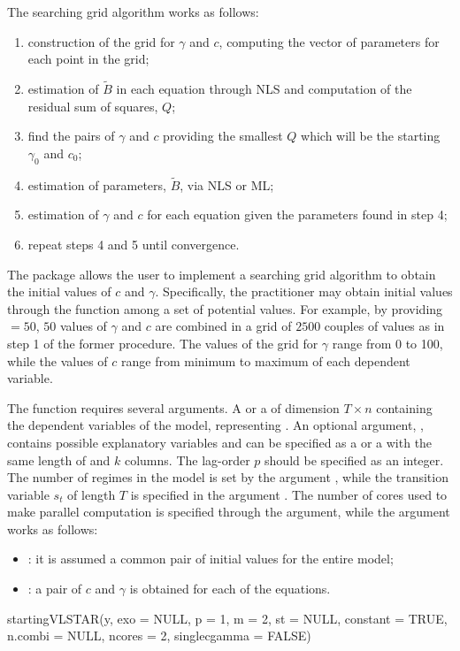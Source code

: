 The searching grid algorithm works as follows:
\begin{enumerate}
	\item construction of the grid for $\gamma$ and $c$, computing the vector of parameters for each point in the grid;
	\item estimation of $\tilde{B}$ in each equation through NLS and computation of the residual sum of squares, $Q$;
	\item find the pairs of $\gamma$ and $c$ providing the smallest $Q$ which will be the starting $\gamma_0$ and $c_0$;
	\item estimation of parameters, $\tilde{B}$, via NLS or ML;
	\item estimation of $\gamma$ and $c$ for each equation given the parameters found in step 4;
	\item repeat steps 4 and 5 until convergence.
\end{enumerate}

The  package allows the user to implement a searching grid algorithm to obtain the initial values of $c$ and $\gamma$. Specifically, the practitioner may obtain initial values through the  function among a set of potential values. For example, by providing $=50$, $50$ values of $\gamma$ and $c$ are combined in a grid of $2500$ couples of values as in step 1 of the former procedure. The values of the grid for $\gamma$ range from 0 to 100, while the values of $c$ range from minimum to maximum of each dependent variable.

The  function requires several arguments. A  or a  of dimension $T \times n$ containing the dependent variables of the model, representing . An optional argument,  , contains possible explanatory variables and can be specified as a  or a  with the same length of  and $k$ columns. The lag-order $p$ should be specified as an integer. The number of regimes in the model is set by the argument , while the transition variable $s_t$ of length $T$ is specified in the argument . The number of cores used to make parallel computation is specified through the  argument, while the argument  works as follows:
		\begin{itemize}
			\item {}: it is assumed a common pair of initial values for the entire model;
			\item {}: a pair of $c$ and $\gamma$ is obtained for each of the equations.
		\end{itemize}
%
\begin{example}
	startingVLSTAR(y, exo = NULL, p = 1,
	m = 2, st = NULL, constant = TRUE,
	n.combi = NULL, ncores = 2,
	singlecgamma = FALSE)
\end{example}
%


